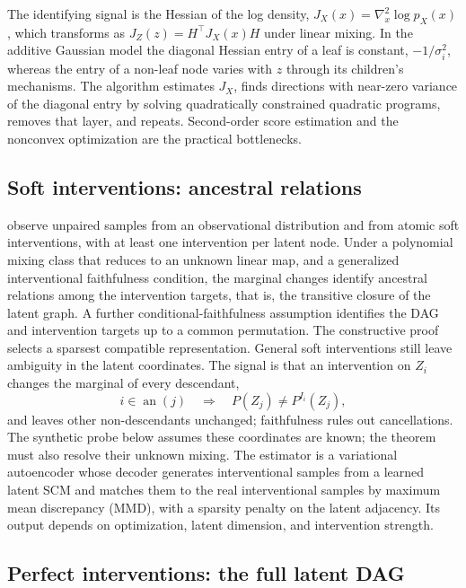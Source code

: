 \documentclass{article}
\newcommand{\an}{\operatorname{an}}
\begin{document}
The identifying signal is the Hessian of the log density, $J_X(x)=\nabla_x^2\log p_X(x)$, which transforms as $J_Z(z)=H^\top J_X(x)H$ under linear mixing. In the additive Gaussian model the diagonal Hessian entry of a leaf is constant, $-1/\sigma_i^2$, whereas the entry of a non-leaf node varies with $z$ through its children's mechanisms. The algorithm estimates $J_X$, finds directions with near-zero variance of the diagonal entry by solving quadratically constrained quadratic programs, removes that layer, and repeats. Second-order score estimation and the nonconvex optimization are the practical bottlenecks.

\subsection{Soft interventions: ancestral relations}

\citet{zhang2023soft} observe unpaired samples from an observational distribution and from atomic soft interventions, with at least one intervention per latent node. Under a polynomial mixing class that reduces to an unknown linear map, and a generalized interventional faithfulness condition, the marginal changes identify ancestral relations among the intervention targets, that is, the transitive closure of the latent graph. A further conditional-faithfulness assumption identifies the DAG and intervention targets up to a common permutation. The constructive proof selects a sparsest compatible representation. General soft interventions still leave ambiguity in the latent coordinates. The signal is that an intervention on $Z_i$ changes the marginal of every descendant,
\begin{equation}
    i\in\an(j)
    \quad\Longrightarrow\quad
    P(Z_j)\neq P^{I_i}(Z_j),
    \label{eq:desc-shift}
\end{equation}
and leaves other non-descendants unchanged; faithfulness rules out cancellations. The synthetic probe below assumes these coordinates are known; the theorem must also resolve their unknown mixing. The estimator is a variational autoencoder whose decoder generates interventional samples from a learned latent SCM and matches them to the real interventional samples by maximum mean discrepancy (MMD), with a sparsity penalty on the latent adjacency. Its output depends on optimization, latent dimension, and intervention strength.

\subsection{Perfect interventions: the full latent DAG}
\end{document}

